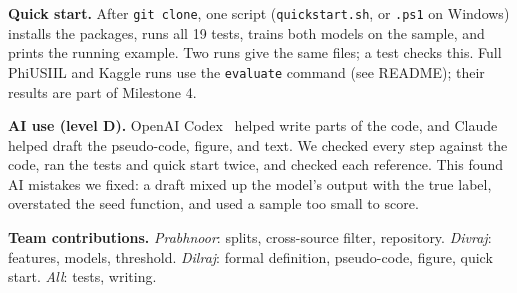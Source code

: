 \documentclass[sigconf,nonacm]{acmart}
\begin{document}
\textbf{Quick start.} After \texttt{git clone}, one script (\texttt{quickstart.sh}, or \texttt{.ps1} on Windows) installs the packages, runs all 19 tests, trains both models on the sample, and prints the running example. Two runs give the same files; a test checks this. Full PhiUSIIL and Kaggle runs use the \texttt{evaluate} command (see README); their results are part of Milestone 4.

\smallskip\noindent\textbf{AI use (level D).} OpenAI Codex~\cite{codex} helped write parts of the code, and Claude~\cite{claude} helped draft the pseudo-code, figure, and text. We checked every step against the code, ran the tests and quick start twice, and checked each reference. This found AI mistakes we fixed: a draft mixed up the model's output with the true label, overstated the seed function, and used a sample too small to score.

\smallskip\noindent\textbf{Team contributions.} \emph{Prabhnoor}: splits, cross-source filter, repository. \emph{Divraj}: features, models, threshold. \emph{Dilraj}: formal definition, pseudo-code, figure, quick start. \emph{All}: tests, writing.



\end{document}
